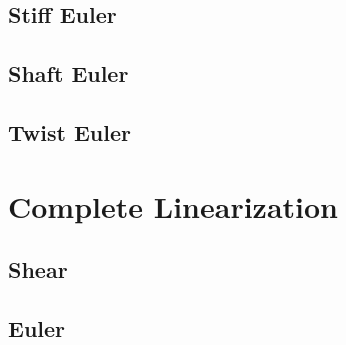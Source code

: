 \subsection{ Stiff Euler }

\clearpage 
\subsection{ Shaft Euler }

\clearpage 
\subsection{ Twist Euler }

\clearpage 
\fi



% 
% 
\clearpage 
\section{Complete Linearization}\label{sec:basic}
\subsection{Shear }

\clearpage 
\subsection{Euler }\label{sec:basic-euler}


\endgroup
